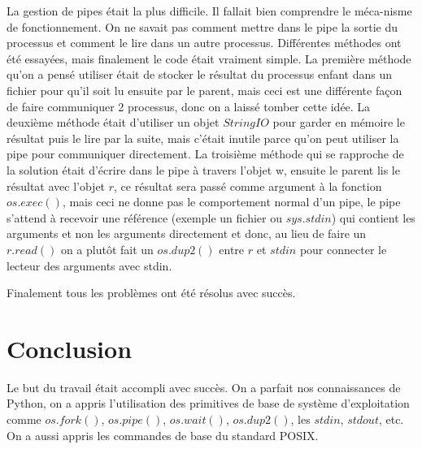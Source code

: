\documentclass{article}
\begin{document}
La gestion de pipes était la plus difficile. Il fallait bien comprendre le méca-nisme de fonctionnement. On ne savait pas comment mettre dans le pipe la sortie du processus et comment le lire dans un autre processus. Différentes méthodes ont été essayées, mais finalement le code était vraiment simple. La première méthode qu’on a pensé utiliser était de stocker le résultat du processus enfant dans un fichier pour qu’il soit lu ensuite par le parent, mais ceci est une différente façon de faire communiquer 2 processus, donc on a laissé tomber cette idée. La deuxième méthode était d’utiliser un objet $StringIO$ pour garder en mémoire le résultat puis le lire par la suite, mais c’était inutile parce qu’on peut utiliser la pipe pour communiquer directement. La troisième méthode qui se rapproche de la solution était d’écrire dans le pipe à travers l’objet w, ensuite le parent lis le résultat avec l’objet $r$, ce résultat sera passé comme argument à la fonction $os.exec()$, mais ceci ne donne pas le comportement normal d’un pipe, le pipe s’attend à recevoir une référence (exemple un fichier ou $sys.stdin$) qui contient les arguments et non les arguments directement et donc, au lieu de faire un $r.read()$ on a plutôt fait un $os.dup2()$ entre $r$ et $stdin$ pour connecter le lecteur des arguments avec stdin.

Finalement tous les problèmes ont été résolus avec succès.

\section*{Conclusion}
Le but du travail était accompli avec succès. On a parfait nos connaissances de Python, on a appris l’utilisation des primitives de base de système d’exploitation comme $os.fork()$, $os.pipe()$, $os.wait()$, $os.dup2()$, les $stdin$, $stdout$, etc. On a aussi appris les commandes de base du standard POSIX.
\end{document}
